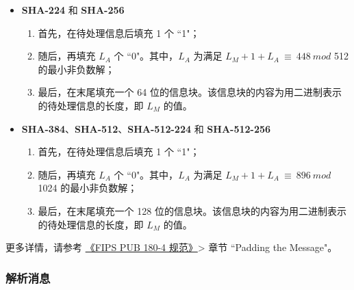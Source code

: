 \documentclass[main\_\_CN.tex]{subfiles}
\begin{document}
\begin{itemize}
    \item \textbf{SHA-224} 和 \textbf{SHA-256}
    \begin{enumerate}
        \item 首先，在待处理信息后填充 1 个 ``1"；
        \item 随后，再填充 \begin{math}L_A\end{math} 个 ``0"。其中，\begin{math}L_A\end{math} 为满足 \begin{math} L_M + 1 + L_A \ {\equiv} \ 448 \ mod \end{math} 512 的最小非负数解；
        \item 最后，在末尾填充一个 64 位的信息块。该信息块的内容为用二进制表示的待处理信息的长度，即 \begin{math}L_M\end{math} 的值。
    \end{enumerate}
    \item \textbf{SHA-384}、\textbf{SHA-512}、\textbf{SHA-512-224} 和 \textbf{SHA-512-256}
    \begin{enumerate}
        \item 首先，在待处理信息后填充 1 个 ``1"；
        \item 随后，再填充 \begin{math}L_A\end{math} 个 ``0"。其中，\begin{math}L_A\end{math} 为满足 \begin{math} L_M + 1 + L_A \ {\equiv} \ 896 \ mod \end{math} 1024 的最小非负数解；
        \item 最后，在末尾填充一个 128 位的信息块。该信息块的内容为用二进制表示的待处理信息的长度，即 \begin{math}L_M\end{math} 的值。
    \end{enumerate}
\end{itemize}

更多详情，请参考 \href{https://doi.org/10.6028/NIST.FIPS.180-4}{《FIPS PUB 180-4 规范》}> 章节 ``Padding the Message"。

\subsubsection{解析消息}\label{sec:ecdsa-msg-parsing}
\end{document}
